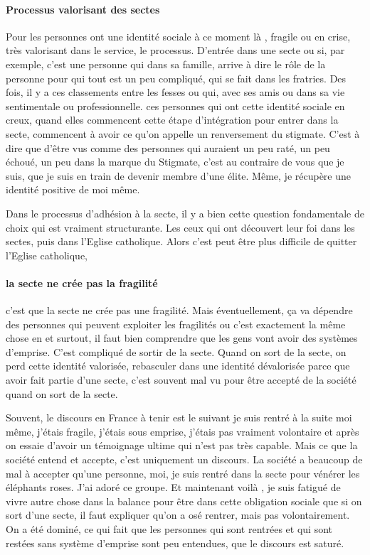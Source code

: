  \paragraph{Processus valorisant des sectes}
Pour les personnes ont une identité sociale à  ce moment là , fragile ou en crise, très valorisant dans le service, le processus.
D'entrée dans une secte ou si, par exemple, c'est une personne qui dans sa famille, arrive à  dire le rôle de la personne pour qui tout est un peu compliqué, qui se fait dans les fratries. Des fois, il y a ces classements entre les fesses ou qui, avec ses amis ou dans sa vie sentimentale ou professionnelle.
  ces personnes qui ont cette identité sociale en creux, quand elles commencent cette étape d'intégration pour entrer dans la secte, commencent à  avoir ce qu'on appelle un renversement du stigmate. C'est à  dire que d'être vus comme des personnes qui auraient un peu raté, un peu échoué, un peu dans la marque du Stigmate, c'est au contraire de vous que je suis, que je suis en train de devenir membre d'une élite.
Même, je récupère une identité positive de moi même. 

Dans le processus d'adhésion à  la secte, il y a bien cette question fondamentale de choix qui est vraiment structurante.
Les ceux qui ont découvert leur foi dans les sectes, puis dans l'Eglise catholique. Alors c'est peut être plus difficile de quitter l'Eglise catholique, 

\paragraph{la secte ne crée pas la fragilité }c'est que la secte ne crée pas une fragilité.
Mais éventuellement, ça va dépendre des personnes qui peuvent exploiter les fragilités ou c'est exactement la même chose en et surtout, il faut bien comprendre que les gens vont avoir des systèmes d'emprise. C'est compliqué de sortir de la secte. Quand on sort de la secte, on perd cette identité valorisée, rebasculer dans une identité dévalorisée parce que avoir fait partie d'une secte, c'est souvent mal vu pour être accepté de la société quand on sort de la secte.

Souvent, le discours en France à  tenir est le suivant je suis rentré à  la suite moi même, j'étais fragile, j'étais sous emprise, j'étais pas vraiment volontaire et après on essaie d'avoir un témoignage ultime qui n'est pas très capable. Mais ce que la société entend et accepte, c'est uniquement un discours. La société a beaucoup de mal à  accepter qu'une personne, moi, je suis rentré dans la secte pour vénérer les éléphants roses.
J'ai adoré ce groupe. Et maintenant voilà , je suis fatigué de vivre autre chose dans la balance pour être dans cette obligation sociale que si on sort d'une secte, il faut expliquer qu'on a osé rentrer, mais pas volontairement. On a été dominé, ce qui fait que les personnes qui sont rentrées et qui sont restées sans système d'emprise sont peu entendues, que le discours est saturé.

